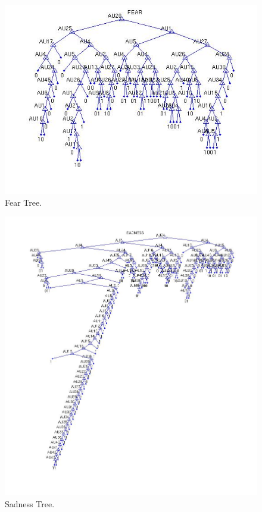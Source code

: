\documentclass[a4paper,12pt,oneside,final]{report}
\begin{document}
\begin{figure}[!h]
\center
\includegraphics[scale=0.6]{fear.jpg}
\caption{Fear Tree.}
\end{figure}


\begin{figure}[!h]
\center
\includegraphics[scale=0.6]{sadness.jpg}
\caption{Sadness Tree.}
\end{figure}
\end{document}
